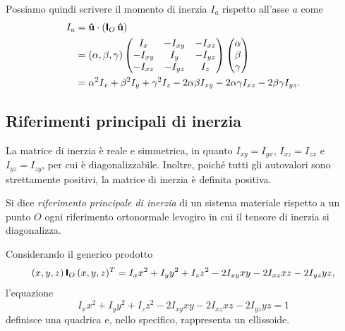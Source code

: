 Possiamo quindi scrivere il momento di inerzia $I_a$ rispetto all'asse $a$ come
\begin{align*}
    I_a &= \vu{u}\cdot (\boldsymbol{\mathsf{I}}_O\,\vu{u}) \\
    &= (\alpha, \beta, \gamma)\begin{pmatrix}
        I_x & -I_{xy} & -I_{xz} \\
        -I_{xy} & I_y & -I_{yz} \\
        -I_{xz} & -I_{yz} & I_z
    \end{pmatrix}
    \begin{pmatrix}
        \alpha \\
        \beta \\
        \gamma
    \end{pmatrix} \\
    &= \alpha^2 I_x + \beta^2 I_y + \gamma^2 I_z - 2\alpha\beta I_{xy} - 2\alpha\gamma I_{xz} - 2\beta\gamma I_{yz}.
\end{align*}

\subsection{Riferimenti principali di inerzia}
La matrice di inerzia è reale e simmetrica, in quanto $I_{xy} = I_{yx}$, $I_{xz} = I_{zx}$ e $I_{yz} = I_{zy}$, per cui è diagonalizzabile.
Inoltre, poiché tutti gli autovalori sono strettamente positivi, la matrice di inerzia è definita positiva.

\begin{definition}
    Si dice \emph{riferimento principale di inerzia} di un sistema materiale rispetto a un punto $O$ ogni riferimento ortonormale levogiro in cui il tensore di inerzia si diagonalizza.
\end{definition}

Considerando il generico prodotto
\begin{equation*}
    (x,y,z)\,\boldsymbol{\mathsf{I}}_O\,(x,y,z)^T = I_x x^2 + I_y y^2 + I_z z^2 - 2I_{xy} xy - 2I_{xz} xz - 2I_{yz} yz,
\end{equation*}
l'equazione
\begin{equation}
    \label{eq:ellissoideInerzia}
    I_x x^2 + I_y y^2 + I_z z^2 - 2I_{xy} xy - 2I_{xz} xz - 2I_{yz} yz = 1
\end{equation}
definisce una quadrica e, nello specifico, rappresenta un ellissoide.

